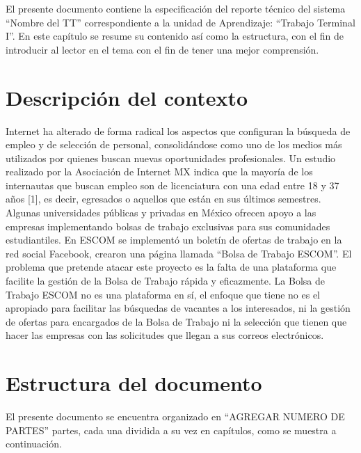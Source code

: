 \selectfont
	El presente documento contiene la especificación del reporte técnico del sistema ``Nombre del TT” correspondiente a la unidad de Aprendizaje: “Trabajo Terminal I''.
	En este capítulo se resume su contenido así como la estructura, con el fin de introducir al lector en el tema con el fin de 
	tener una mejor comprensión.

	\section{Descripción del contexto}
	Internet ha alterado de forma radical los aspectos que configuran la búsqueda de empleo y de selección de personal, 
	consolidándose como uno de los medios más utilizados por quienes buscan nuevas oportunidades profesionales. Un estudio 
	realizado por la Asociación de Internet MX indica que la mayoría de los internautas que buscan empleo son de licenciatura con 
	una edad entre 18 y 37 años [1], es decir, egresados o aquellos que están en sus últimos semestres. Algunas universidades 
	públicas y privadas en México ofrecen apoyo a las empresas implementando bolsas de trabajo exclusivas para sus comunidades 
	estudiantiles. En ESCOM se implementó un boletín de ofertas de trabajo en la red social Facebook, crearon una página llamada 
	``Bolsa de Trabajo ESCOM''. \newline
	El problema que pretende atacar este proyecto es la falta de una plataforma que facilite la gestión de la Bolsa de Trabajo 
	rápida y eficazmente. La Bolsa de Trabajo ESCOM no es una plataforma en sí, el enfoque que tiene no es el apropiado para 
	facilitar las búsquedas de vacantes a los interesados, ni la gestión de ofertas para encargados de la Bolsa de Trabajo ni 
	la selección que tienen que hacer las empresas con las solicitudes que llegan a sus correos electrónicos.



    \section{Estructura del documento}

       
	El presente documento se encuentra organizado en ``AGREGAR NUMERO DE PARTES'' partes, cada una dividida a su vez en capítulos, 
	como se muestra a continuación. \\


